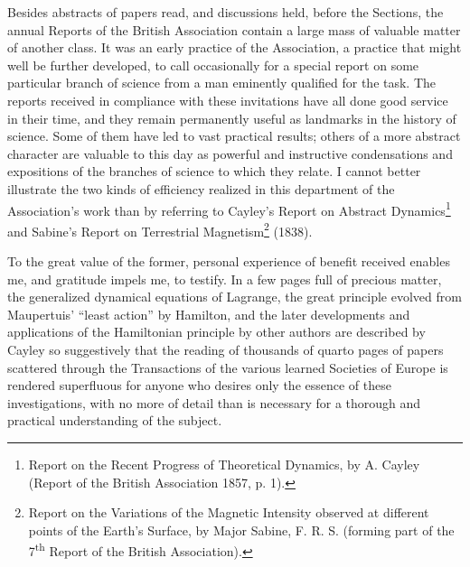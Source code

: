 \documentclass[a4paper, 11pt, oneside, english]{article}
\begin{document}
Besides abstracts of papers read, and discussions held, before the Sections, the annual Reports of the British Association contain a large mass of valuable matter of another class. It was an early practice of the Association, a practice that might well be further developed, to call occasionally for a special report on some particular branch of science from a man eminently qualified for the task. The reports received in compliance with these invitations have all done good service in their time, and they remain permanently useful as landmarks in the history of science. Some of them have led to vast practical results; others of a more abstract character are valuable to this day as powerful and instructive condensations and expositions of the branches of science to which they relate. I cannot better illustrate the two kinds of efficiency realized in this department of the Association's work than by referring to Cayley's Report on Abstract Dynamics\footnote{Report on the Recent Progress of Theoretical Dynamics, by A. Cayley (Report of the British Association 1857, p. 1).} and Sabine's Report on Terrestrial Magnetism\footnote{Report on the Variations of the Magnetic Intensity observed at different points of the Earth's Surface, by Major Sabine, F. R. S. (forming part of the 7\textsuperscript{th} Report of the British Association).} (1838).

To the great value of the former, personal experience of benefit received enables me, and gratitude impels me, to testify. In a few pages full of precious matter, the generalized dynamical equations of Lagrange, the great principle evolved from Maupertuis' ``least action'' by Hamilton, and the later developments and applications of the Hamiltonian principle by other authors are described by Cayley so suggestively that the reading of thousands of quarto pages of papers scattered through the Transactions of the various learned Societies of Europe is rendered superfluous for anyone who desires only the essence of these investigations, with no more of detail than is necessary for a thorough and practical understanding of the subject.
\end{document}
